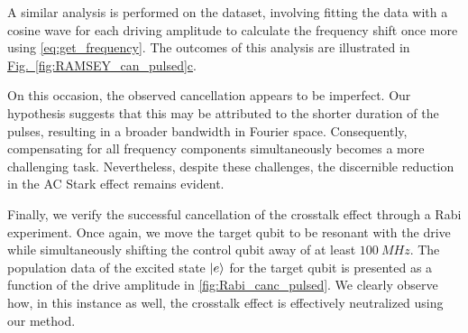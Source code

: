 A similar analysis is performed on the dataset, involving fitting the data with a cosine wave for each driving amplitude to calculate the frequency shift once more using \cref{eq:get_frequency}.
The outcomes of this analysis are illustrated in \hyperref[fig:RAMSEY_can_pulsed]{Fig.~\ref{fig:RAMSEY_can_pulsed}c}.

On this occasion, the observed cancellation appears to be imperfect.
Our hypothesis suggests that this may be attributed to the shorter duration of the pulses, resulting in a broader bandwidth in Fourier space.
Consequently, compensating for all frequency components simultaneously becomes a more challenging task. 
Nevertheless, despite these challenges, the discernible reduction in the AC Stark effect remains evident.

Finally, we verify the successful cancellation of the crosstalk effect through a Rabi experiment.
Once again, we move the target qubit to be resonant with the drive while simultaneously shifting the control qubit away of at least $\SI{100}{MHz}$.
The population data of the excited state $\ket{e}$ for the target qubit is presented as a function of the drive amplitude in \cref{fig:Rabi_canc_pulsed}.
We clearly observe how, in this instance as well, the crosstalk effect is effectively neutralized using our method.

